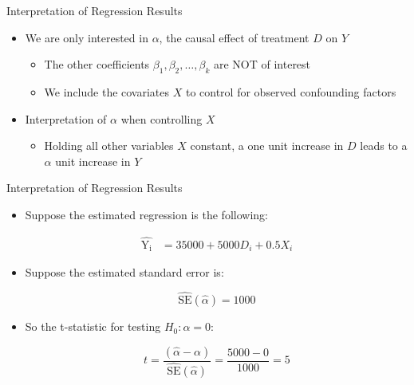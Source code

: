 \documentclass[dvipsnames,hyperref={pdfpagelabels=false}]{beamer}
\begin{document}
\begin{frame}{Interpretation of Regression Results}
	\begin{itemize}
		
		\item We are only interested in $\alpha$, the causal effect of treatment $D$ on $Y$
		\vspace{0.2cm} 
		\begin{itemize}
			\item The other coefficients $\beta_1, \beta_2, \ldots, \beta_k$ are NOT of interest
			\vspace{0.2cm} 
			\item We include the covariates $X$ to control for observed confounding factors
			
		\end{itemize}
		\vspace{0.2cm} 
		\item Interpretation of $\alpha$ when controlling $X$
		
		\vspace{0.2cm} 
		\begin{itemize}
			\item Holding all other variables $X$ constant, a one unit increase in $D$ leads to a $\alpha$ unit increase in $Y$
			\vspace{0.2cm} 
		\end{itemize}
		
		
	\end{itemize}
\end{frame}



\begin{frame}{Interpretation of Regression Results}
\begin{itemize} 
\item Suppose the estimated regression is the following:


\begin{align*}
	\hat{\mathrm{Y_{i}}} &= 35000 + 5000 D_{i} + 0.5 X_{i}
	\end{align*}

\item Suppose the estimated standard error is:

\begin{equation*}
	\hat{\mathrm{SE}}(\hat{\alpha})= 1000 
	\end{equation*}
\item So the t-statistic for testing $H_{0}: \alpha=0$:

\begin{equation*}
t = \dfrac{(\hat{\alpha}-\alpha)}{\hat{\mathrm{SE}}(\hat{\alpha})} = \dfrac{5000-0}{1000} = 5
	\end{equation*}

\end{itemize}
\end{frame}
\end{document}
